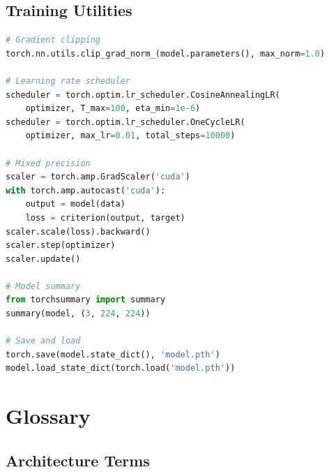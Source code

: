 \section{Training Utilities}

\begin{lstlisting}[language=Python, caption={Common training utilities}]
# Gradient clipping
torch.nn.utils.clip_grad_norm_(model.parameters(), max_norm=1.0)

# Learning rate scheduler
scheduler = torch.optim.lr_scheduler.CosineAnnealingLR(
    optimizer, T_max=100, eta_min=1e-6)
scheduler = torch.optim.lr_scheduler.OneCycleLR(
    optimizer, max_lr=0.01, total_steps=10000)

# Mixed precision
scaler = torch.amp.GradScaler('cuda')
with torch.amp.autocast('cuda'):
    output = model(data)
    loss = criterion(output, target)
scaler.scale(loss).backward()
scaler.step(optimizer)
scaler.update()

# Model summary
from torchsummary import summary
summary(model, (3, 224, 224))

# Save and load
torch.save(model.state_dict(), 'model.pth')
model.load_state_dict(torch.load('model.pth'))
\end{lstlisting}

\chapter{Glossary}

\section{Architecture Terms}

